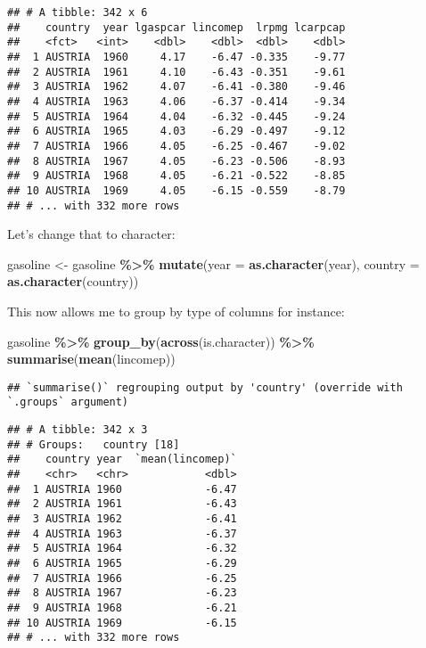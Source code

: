 \documentclass[
]{article}
\newenvironment{Shaded}{\begin{snugshade}}{\end{snugshade}}
\newcommand{\DataTypeTok}[1]{\textcolor[rgb]{0.13,0.29,0.53}{#1}}
\newcommand{\KeywordTok}[1]{\textcolor[rgb]{0.13,0.29,0.53}{\textbf{#1}}}
\newcommand{\NormalTok}[1]{#1}
\newcommand{\OperatorTok}[1]{\textcolor[rgb]{0.81,0.36,0.00}{\textbf{#1}}}
\newcommand{\StringTok}[1]{\textcolor[rgb]{0.31,0.60,0.02}{#1}}
\begin{document}
\begin{verbatim}
## # A tibble: 342 x 6
##    country  year lgaspcar lincomep  lrpmg lcarpcap
##    <fct>   <int>    <dbl>    <dbl>  <dbl>    <dbl>
##  1 AUSTRIA  1960     4.17    -6.47 -0.335    -9.77
##  2 AUSTRIA  1961     4.10    -6.43 -0.351    -9.61
##  3 AUSTRIA  1962     4.07    -6.41 -0.380    -9.46
##  4 AUSTRIA  1963     4.06    -6.37 -0.414    -9.34
##  5 AUSTRIA  1964     4.04    -6.32 -0.445    -9.24
##  6 AUSTRIA  1965     4.03    -6.29 -0.497    -9.12
##  7 AUSTRIA  1966     4.05    -6.25 -0.467    -9.02
##  8 AUSTRIA  1967     4.05    -6.23 -0.506    -8.93
##  9 AUSTRIA  1968     4.05    -6.21 -0.522    -8.85
## 10 AUSTRIA  1969     4.05    -6.15 -0.559    -8.79
## # ... with 332 more rows
\end{verbatim}

Let's change that to character:

\begin{Shaded}
\begin{Highlighting}[]
\NormalTok{gasoline \textless{}{-}}\StringTok{ }\NormalTok{gasoline }\OperatorTok{\%\textgreater{}\%}
\StringTok{  }\KeywordTok{mutate}\NormalTok{(}\DataTypeTok{year =} \KeywordTok{as.character}\NormalTok{(year),}
         \DataTypeTok{country =} \KeywordTok{as.character}\NormalTok{(country))}
\end{Highlighting}
\end{Shaded}

This now allows me to group by type of columns for instance:

\begin{Shaded}
\begin{Highlighting}[]
\NormalTok{gasoline }\OperatorTok{\%\textgreater{}\%}
\StringTok{  }\KeywordTok{group\_by}\NormalTok{(}\KeywordTok{across}\NormalTok{(is.character)) }\OperatorTok{\%\textgreater{}\%}
\StringTok{  }\KeywordTok{summarise}\NormalTok{(}\KeywordTok{mean}\NormalTok{(lincomep))}
\end{Highlighting}
\end{Shaded}

\begin{verbatim}
## `summarise()` regrouping output by 'country' (override with `.groups` argument)
\end{verbatim}

\begin{verbatim}
## # A tibble: 342 x 3
## # Groups:   country [18]
##    country year  `mean(lincomep)`
##    <chr>   <chr>            <dbl>
##  1 AUSTRIA 1960             -6.47
##  2 AUSTRIA 1961             -6.43
##  3 AUSTRIA 1962             -6.41
##  4 AUSTRIA 1963             -6.37
##  5 AUSTRIA 1964             -6.32
##  6 AUSTRIA 1965             -6.29
##  7 AUSTRIA 1966             -6.25
##  8 AUSTRIA 1967             -6.23
##  9 AUSTRIA 1968             -6.21
## 10 AUSTRIA 1969             -6.15
## # ... with 332 more rows
\end{verbatim}
\end{document}
